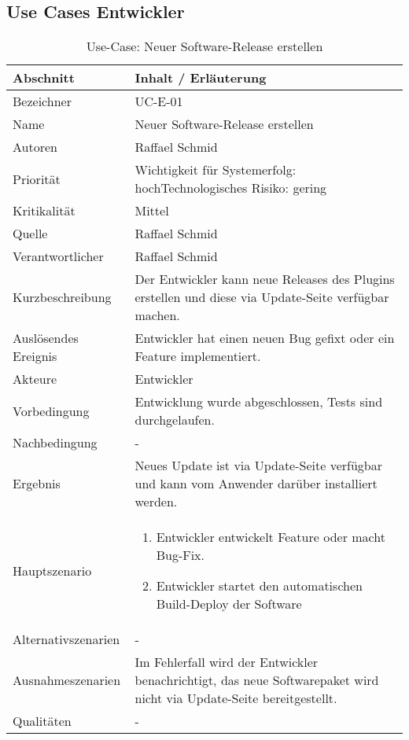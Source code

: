 \subsection{Use Cases Entwickler}
\begin{longtable}{|p{4cm}|p{10.5cm}|}
\caption{Use-Case: Neuer Software-Release erstellen}\\\hline
   \textbf{Abschnitt} & \textbf{Inhalt / Erläuterung} \\\hline
   Bezeichner & UC-E-01\\\hline
   Name & Neuer Software-Release erstellen\\\hline
   Autoren & Raffael Schmid\\\hline
   Priorität & Wichtigkeit für Systemerfolg: hoch\newline Technologisches Risiko: gering\\\hline
   Kritikalität & Mittel\\\hline
   Quelle & Raffael Schmid\\\hline
   Verantwortlicher & Raffael Schmid\\\hline
   Kurzbeschreibung & Der Entwickler kann neue Releases des Plugins erstellen und diese via Update-Seite verfügbar machen.\\\hline
   Auslösendes Ereignis & Entwickler hat einen neuen Bug gefixt oder ein Feature implementiert.\\\hline
   Akteure & Entwickler\\\hline
   Vorbedingung & Entwicklung wurde abgeschlossen, Tests sind durchgelaufen.\\\hline
   Nachbedingung & -\\\hline
   Ergebnis & Neues Update ist via Update-Seite verfügbar und kann vom Anwender darüber installiert werden.\\\hline
   Hauptszenario & 
	\begin{enumerate}
		\item Entwickler entwickelt Feature oder macht Bug-Fix.
		\item Entwickler startet den automatischen Build-Deploy der Software
	\end{enumerate}
	\\\hline
   Alternativszenarien & -\\\hline
   Ausnahmeszenarien & Im Fehlerfall wird der Entwickler benachrichtigt, das neue Softwarepaket wird nicht via Update-Seite bereitgestellt.\\\hline
   Qualitäten & - \\\hline
\end{longtable}



